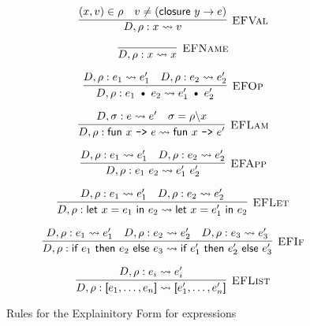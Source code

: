 \documentclass{article}
\def\code#1{\texttt{#1}}
\def\codesf#1{\textsf{#1}}
\def\binop{\ \text{\textbullet}\ }
\def\xnf#1#2#3{D,#1 : #2 \rightsquigarrow #3}
\begin{document}
\begin{figure*}[h]

$$
\infer[\textsc{EFVal}]{
    D, \rho : x \rightsquigarrow v
}{
    (x, v) \in \rho
    &
    v \neq (\textsf{closure } y \to e)
}
$$

$$
\infer[\textsc{EFName}]{
    D, \rho : x \rightsquigarrow x
}{}
$$

$$
\infer[\textsc{EFOp}]{
    D, \rho : e_1 \binop e_2 \rightsquigarrow e_1' \binop e_2'
}{
    D, \rho : e_1 \rightsquigarrow e_1'
    &
    D, \rho : e_2 \rightsquigarrow e_2'
}
$$


$$
\infer[\textsc{EFLam}]{
    D, \rho : \codesf{fun } x \ \code{->}\  e \rightsquigarrow \codesf{fun } x \ \code{->}\ e'
}{
    D, \sigma : e \rightsquigarrow e'
    &
    \sigma = \rho \backslash x
}
$$

$$
\infer[\textsc{EFApp}]{
    D, \rho : e_1 \ e_2 \rightsquigarrow e_1' \ e_2'
}{
    D, \rho : e_1 \rightsquigarrow e_1'
    &
    D, \rho : e_2 \rightsquigarrow e_2'
}
$$

$$
\infer[\textsc{EFLet}]{
    D, \rho : \codesf{let } x = e_1 \codesf{ in } e_2 \rightsquigarrow \codesf{let } x = e_1' \codesf{ in } e_2
}{
    \xnf{\rho}{e_1}{e_1'}
    &
    \xnf{\rho}{e_2}{e_2'}
}
$$

$$
\infer[\textsc{EFIf}]{
	D, \rho : \codesf{if}\ e_1\ \codesf{then}\ e_2\ \codesf{else}\ e_3 \rightsquigarrow \codesf{if}\ e_1'\ \codesf{then}\ e_2'\ \codesf{else}\ e_3'
}{
	D, \rho : e_1 \rightsquigarrow e_1'
	&
	D, \rho : e_2 \rightsquigarrow e_2'
	&
	D, \rho : e_3 \rightsquigarrow e_3'
}
$$

$$
\infer[\textsc{EFList}]{
    D, \rho : \codesf [e_1,\ldots,e_n\codesf ] \rightsquigarrow \codesf [e_1',\ldots,e_n'\codesf ]
}{
    D, \rho : e_i \rightsquigarrow e_i'
}
$$	

\caption{Rules for the Explainitory Form for expressions}
\end{figure*}

\pagebreak
\end{document}
